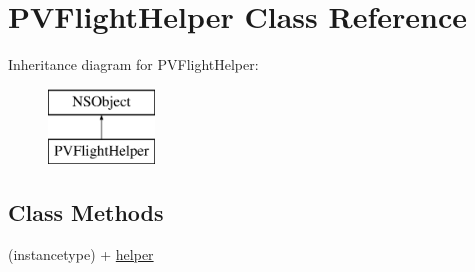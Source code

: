 \hypertarget{interface_p_v_flight_helper}{}\section{P\+V\+Flight\+Helper Class Reference}
\label{interface_p_v_flight_helper}
Inheritance diagram for P\+V\+Flight\+Helper\+:\begin{figure}[H]
\begin{center}
\leavevmode
\includegraphics[height=2.000000cm]{interface_p_v_flight_helper}
\end{center}
\end{figure}
\subsection*{Class Methods}
\begin{DoxyCompactItemize}
\item 
(instancetype) + \hyperlink{interface_p_v_flight_helper_a7559e8c1ab7b0bfccff926ca9df58ac1}{helper}
\end{DoxyCompactItemize}
